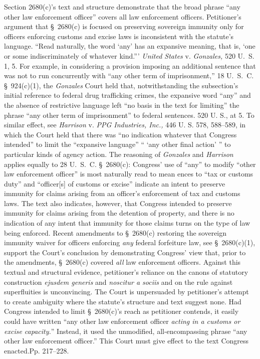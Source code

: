   Section 2680(c)'s text and structure demonstrate that the broad phrase ``any other law enforcement officer'' covers all law enforcement officers. Petitioner's argument that \S~2680(c) is focused on preserving sovereign immunity only for officers enforcing customs and excise laws is inconsistent with the statute's language. ``Read naturally, the word ‘any' has an expansive meaning, that is, ‘one or some indiscriminately of whatever kind.''' \emph{United States} v. \emph{Gonzales,} 520 U.~S. 1, 5. For example, in considering a provision imposing an additional sentence that was not to run concurrently with ``any other term of imprisonment,'' 18 U.~S.~C. \S~924(c)(1), the \emph{Gonzales} Court held that, notwithstanding the subsection's initial reference to federal drug trafficking crimes, the expansive word ``any'' and the absence of restrictive language left ``no basis in the text for limiting'' the phrase ``any other term of imprisonment'' to federal sentences. 520 U. S., at 5. To similar effect, see \emph{Harrison} v. \emph{PPG Industries, Inc.,} 446 U. S. 578, 588--589, in which the Court held that there was ``no indication whatever that Congress intended'' to limit the ``expansive language'' `` ‘any other final action' '' to particular kinds of agency action. The reasoning of \emph{Gonzales} and \emph{Harrison} applies equally to 28 U.~S.~C. \S~2680(c): Congress' use of ``any'' to modify ``other law enforcement officer'' is most naturally read to mean \newpage  ences to ``tax or customs duty'' and ``officer[s] of customs or excise'' indicate an intent to preserve immunity for claims arising from an officer's enforcement of tax and customs laws. The text also indicates, however, that Congress intended to preserve immunity for claims arising from the detention of property, and there is no indication of any intent that immunity for those claims turns on the type of law being enforced. Recent amendments to \S~2680(c) restoring the sovereign immunity waiver for officers enforcing \emph{any} federal forfeiture law, see \S~2680(c)(1), support the Court's conclusion by demonstrating Congress' view that, prior to the amendments, \S~2680(c) covered \emph{all} law enforcement officers. Against this textual and structural evidence, petitioner's reliance on the canons of statutory construction \emph{ejusdem generis} and \emph{noscitur a sociis} and on the rule against superfluities is unconvincing. The Court is unpersuaded by petitioner's attempt to create ambiguity where the statute's structure and text suggest none. Had Congress intended to limit \S~2680(c)'s reach as petitioner contends, it easily could have written ``any other law enforcement officer \emph{acting in a customs or excise capacity.}'' Instead, it used the unmodified, all-encompassing phrase ``any other law enforcement officer.'' This Court must give effect to the text Congress enacted.Pp. 217--228.

